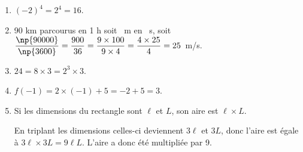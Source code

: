 
\medskip


%
%
\begin{enumerate}
\item $(- 2)^4 = 2^4 = 16$.
\item 90 km parcourus en 1 h soit ~m en ~s, soit $\dfrac{\np{90000}}{\np{3600}} = \dfrac{900}{36} = \dfrac{9 \times 100}{9 \times 4}=  \dfrac{4 \times 25}{4} = 25$~m/s.
\item $24 = 8 \times 3 = 2^3 \times 3$.
\item $f(- 1) = 2\times (- 1) + 5 = - 2 + 5 = 3$.
\item Si les dimensions du rectangle sont $\ell$ et $L$, son aire est $\ell \times L$.

En triplant les dimensions celles-ci deviennent $3\ell$ et $3L$, donc l'aire est égale à $3\ell \times 3L = 9\ell L$. L'aire a donc été multipliée par 9.
\end{enumerate}


\bigskip

